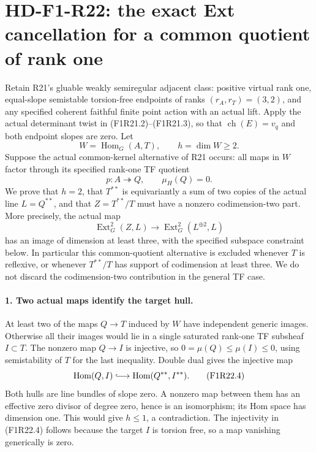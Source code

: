 \section[HD-F1-R22: the actual hull-quotient cancellation]{HD-F1-R22: the exact Ext cancellation for a common quotient of rank one}
\label{sec:followup-rm-rank-one-quotient-cancellation}

Retain R21's gluable weakly semiregular adjacent class:
positive virtual rank one, equal-slope semistable torsion-free
endpoints of ranks $(r_A,r_T)=(3,2)$, and any specified
coherent faithful finite point action with an actual lift.
Apply the actual determinant twist in (F1R21.2)--(F1R21.3),
so that $\operatorname{ch}(E)=v_q$ and both endpoint slopes
are zero. Let
\[
 W=\operatorname{Hom}_G(A,T),\qquad h=\dim W\ge2.
 \tag{F1R22.1}
\]
Suppose the actual common-kernel alternative of R21 occurs:
all maps in $W$ factor through its specified rank-one
TF quotient
\[
                p:A\twoheadrightarrow Q,
                       \qquad \mu_H(Q)=0.
 \tag{F1R22.2}
\]
We prove that $h=2$, that $T^{**}$ is equivariantly a
sum of two copies of the actual line $L=Q^{**}$, and
that $Z=T^{**}/T$ must have a nonzero codimension-two
part. More precisely, the actual map
\[
 \operatorname{Ext}^2_G(Z,L)\longrightarrow
                   \operatorname{Ext}^2_G(L^{\oplus2},L)
 \tag{F1R22.3}
\]
has an image of dimension at least three, with the
specified subspace constraint below. In particular
this common-quotient alternative is excluded whenever
$T$ is reflexive, or whenever $T^{**}/T$ has support
of codimension at least three. We do not discard the
codimension-two contribution in the general TF case.

\paragraph{1. Two actual maps identify the target hull.}
At least two of the maps $Q\to T$ induced by $W$ have
independent generic images. Otherwise all their images
would lie in a single saturated rank-one TF subsheaf
$I\subset T$. The nonzero map $Q\to I$ is injective,
so $0=\mu(Q)\le\mu(I)\le0$, using semistability of
$T$ for the last inequality. Double dual gives the
injective map
\[
 \operatorname{Hom}(Q,I)\lhook\joinrel\longrightarrow
                            \operatorname{Hom}(Q^{**},I^{**}).
 \tag{F1R22.4}
\]
Both hulls are line bundles of slope zero. A nonzero
map between them has an effective zero divisor of
degree zero, hence is an isomorphism; its Hom space
has dimension one. This would give $h\le1$, a
contradiction. The injectivity in (F1R22.4) follows
because the target $I$ is torsion free, so a map
vanishing generically is zero.

